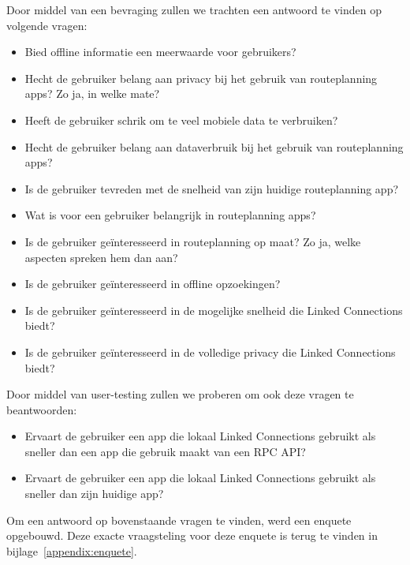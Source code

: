 Door middel van een bevraging zullen we trachten een antwoord te vinden op volgende vragen:
\begin{itemize}
	\item Bied offline informatie een meerwaarde voor gebruikers?
	\item Hecht de gebruiker belang aan privacy bij het gebruik van routeplanning apps? Zo ja, in welke mate?
	\item Heeft de gebruiker schrik om te veel mobiele data te verbruiken?
	\item Hecht de gebruiker belang aan dataverbruik bij het gebruik van routeplanning apps?
	\item Is de gebruiker tevreden met de snelheid van zijn huidige routeplanning app?
	\item Wat is voor een gebruiker belangrijk in routeplanning apps?
	\item Is de gebruiker geïnteresseerd in routeplanning op maat? Zo ja, welke aspecten spreken hem dan aan?
	\item Is de gebruiker geïnteresseerd in offline opzoekingen?
	\item Is de gebruiker geïnteresseerd in de mogelijke snelheid die Linked Connections biedt?
	\item Is de gebruiker geïnteresseerd in de volledige privacy die Linked Connections biedt?
\end{itemize}

Door middel van user-testing zullen we proberen om ook deze vragen te beantwoorden:
\begin{itemize}
	\item Ervaart de gebruiker een app die lokaal Linked Connections gebruikt als sneller dan een app die gebruik maakt van een RPC API?
	\item Ervaart de gebruiker een app die lokaal Linked Connections gebruikt als sneller dan zijn huidige app?
\end{itemize}

Om een antwoord op bovenstaande vragen te vinden, werd een enquete opgebouwd. Deze exacte vraagsteling voor deze enquete is terug te vinden in bijlage~\ref{appendix:enquete}.